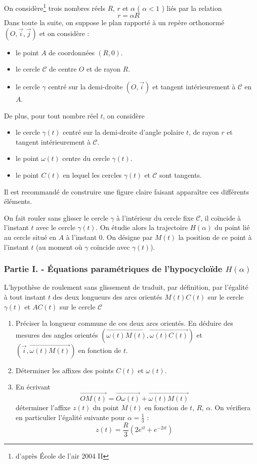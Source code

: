 On considère\footnote{d'après {\'E}cole de l'air 2004 II} trois nombres réels $R$, $r$ et $\alpha$ ( $\alpha <1$ ) liés par la relation
\[r=\alpha R\] 
Dans toute la suite, on suppose le plan rapporté à un repère orthonormé $(O,\overrightarrow{i},\overrightarrow{j})$ et on considère :
\begin{itemize}
\item le point $A$ de coordonnées $(R,0)$.
\item le cercle $\mathcal{C}$ de centre $O$ et de rayon $R$.
\item le cercle $\gamma$ centré sur la demi-droite $(O,\overrightarrow{i})$ et tangent intérieurement à $\mathcal{C}$ en $A$. 
\end{itemize}
De plus, pour tout nombre réel $t$, on considère
\begin{itemize}
\item le cercle $\gamma (t)$ centré sur la demi-droite d'angle polaire $t$, de rayon $r$ et tangent intérieurement à $\mathcal{C}$.
\item le point $\omega (t)$ centre du cercle $\gamma(t)$.
\item le point $C(t)$ en lequel les cercles $\gamma (t)$ et $\mathcal{C}$ sont tangents.
\end{itemize}
Il est recommandé de construire une figure claire faisant apparaître ces différents éléments.

On fait rouler sans glisser le cercle $\gamma$ à l'intérieur du cercle fixe $\mathcal{C}$, il coïncide à l'instant $t$ avec le cercle $\gamma(t)$. On étudie alors la trajectoire $H(\alpha)$ du point lié au cercle situé en $A$ à l'instant $0$. On désigne par $M(t)$ la position de ce point à l'instant $t$ (au moment où $\gamma$ coïncide avec $\gamma(t)$).

\subsubsection*{Partie I. - {\'E}quations paramétriques de l'hypocycloïde $H(\alpha)$}
L'hypothèse de roulement sans glissement de traduit, par définition, par l'égalité à tout instant $t$ des deux longueurs des arcs orientés $M(t)C(t)$ sur le cercle $\gamma(t)$ et $AC(t)$ sur le cercle $\mathcal{C}$
\begin{enumerate}
\item Préciser la longueur commune de ces deux arcs orientés. En déduire des mesures des angles orientés $(\overrightarrow{\omega(t)M(t)},\overrightarrow{\omega(t)C(t)})$ et $(\overrightarrow{i},\overrightarrow{\omega(t)M(t)})$ en fonction de $t$.
\item Déterminer les affixes des points $C(t)$ et $\omega(t)$.
\item En écrivant
\[\overrightarrow{OM(t)}=\overrightarrow{O\omega(t)} + \overrightarrow{\omega(t) M(t)}\]
déterminer l'affixe $z(t)$ du point $M(t)$ en fonction de $t$, $R$, $\alpha$.\newline
On vérifiera en particulier l'égalité suivante pour $\alpha=\frac{1}{3}$ :
\[z(t)=\frac{R}{3}(2e^{it}+e^{-2it})\]
\end{enumerate} 

